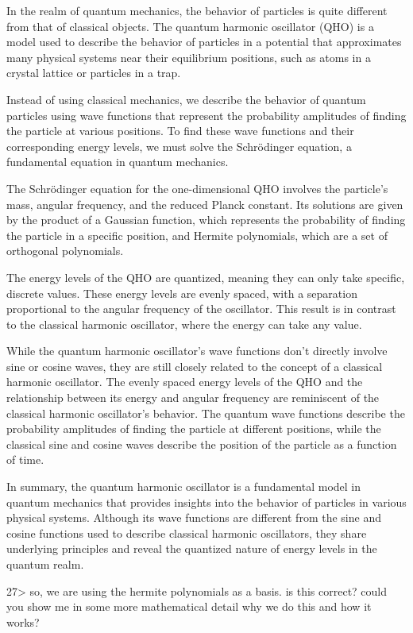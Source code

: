 \documentclass[
]{article}
\begin{document}
In the realm of quantum mechanics, the behavior of particles is quite
different from that of classical objects. The quantum harmonic
oscillator (QHO) is a model used to describe the behavior of particles
in a potential that approximates many physical systems near their
equilibrium positions, such as atoms in a crystal lattice or particles
in a trap.

Instead of using classical mechanics, we describe the behavior of
quantum particles using wave functions that represent the probability
amplitudes of finding the particle at various positions. To find these
wave functions and their corresponding energy levels, we must solve the
Schrödinger equation, a fundamental equation in quantum mechanics.

The Schrödinger equation for the one-dimensional QHO involves the
particle's mass, angular frequency, and the reduced Planck constant. Its
solutions are given by the product of a Gaussian function, which
represents the probability of finding the particle in a specific
position, and Hermite polynomials, which are a set of orthogonal
polynomials.

The energy levels of the QHO are quantized, meaning they can only take
specific, discrete values. These energy levels are evenly spaced, with a
separation proportional to the angular frequency of the oscillator. This
result is in contrast to the classical harmonic oscillator, where the
energy can take any value.

While the quantum harmonic oscillator's wave functions don't directly
involve sine or cosine waves, they are still closely related to the
concept of a classical harmonic oscillator. The evenly spaced energy
levels of the QHO and the relationship between its energy and angular
frequency are reminiscent of the classical harmonic oscillator's
behavior. The quantum wave functions describe the probability amplitudes
of finding the particle at different positions, while the classical sine
and cosine waves describe the position of the particle as a function of
time.

In summary, the quantum harmonic oscillator is a fundamental model in
quantum mechanics that provides insights into the behavior of particles
in various physical systems. Although its wave functions are different
from the sine and cosine functions used to describe classical harmonic
oscillators, they share underlying principles and reveal the quantized
nature of energy levels in the quantum realm.

27\textgreater{} so, we are using the hermite polynomials as a basis. is
this correct? could you show me in some more mathematical detail why we
do this and how it works?
\end{document}
